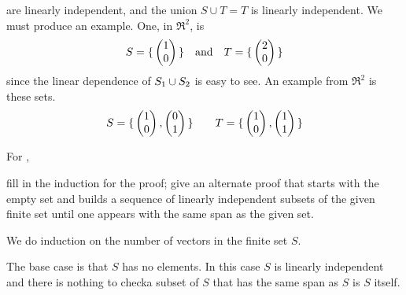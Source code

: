 \begin{exercises}
\begin{answer}
\begin{exparts}
          are linearly independent, and the union \( S\cup T=T \) is
          linearly independent.
        \partsitem We must produce an example.
          One, in \( \Re^2 \), is
          \begin{equation*}
            S=\mbox{$\{\,\begin{pmatrix} 1 \\ 0 \end{pmatrix}\,\}$}
            \quad\text{and}\quad
            T=\mbox{$\{\,\begin{pmatrix} 2 \\ 0 \end{pmatrix}\,\}$}
          \end{equation*}
          since the linear dependence of \( S_1\cup S_2 \) is easy to see.
        \partsitem 
          An example from \( \Re^2 \) is these sets.
          \begin{equation*}
            S=\mbox{$\{\,\begin{pmatrix} 1 \\ 0 \end{pmatrix}, \begin{pmatrix} 0 \\ 1 \end{pmatrix}\,\}$}
            \qquad
            T=\mbox{$\{\,\begin{pmatrix} 1 \\ 0 \end{pmatrix}, \begin{pmatrix} 1 \\ 1 \end{pmatrix}\,\}$}
          \end{equation*}
      \end{exparts}  
    \end{answer}
  \recommended \item \label{exer:FillIndDetProofSetHasLISub}
    For ,
    \begin{exparts}
       \partsitem fill in the induction for the proof;
       \partsitem give an alternate proof that starts with the empty
         set and builds
         a sequence of linearly independent subsets of the given finite set
         until one appears with the same span as the given set.
    \end{exparts}
    \begin{answer}
      \begin{exparts}
         \partsitem We do induction on the number of vectors in the finite set
           \( S \).

           The base case is that $S$ has no elements.
           In this case $S$ is linearly independent and there is nothing to 
           check\Dash a subset of $S$ that has the same span as $S$ is $S$
           itself.


\end{exparts}
\end{answer}
\end{exercises}

